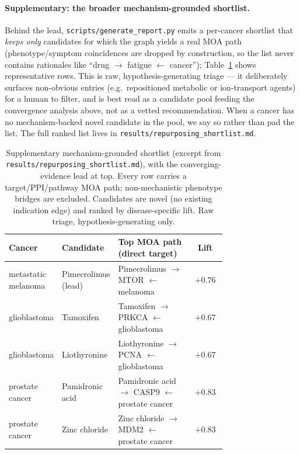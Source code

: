 \documentclass[11pt]{article}
\begin{document}
\begin{sloppypar}
\paragraph{Supplementary: the broader mechanism-grounded shortlist.} Behind the lead,
\texttt{scripts/generate\_report.py} emits a per-cancer shortlist that \emph{keeps only}
candidates for which the graph yields a real MOA path (phenotype/symptom coincidences are
dropped by construction, so the list never contains rationales like
``drug $\to$ fatigue $\leftarrow$ cancer''); Table~\ref{tab:dossier} shows representative rows.
This is raw, hypothesis-generating triage --- it deliberately surfaces non-obvious entries
(e.g.\ repositioned metabolic or ion-transport agents) for a human to filter, and is best read
as a candidate pool feeding the convergence analysis above, not as a vetted recommendation.
When a cancer has no mechanism-backed novel candidate in the pool, we say so rather than pad
the list. The full ranked list lives in \texttt{results/repurposing\_shortlist.md}.
\end{sloppypar}

\begin{table}[H]
\centering\small
\begin{tabular}{>{\raggedright\arraybackslash}p{0.20\linewidth} >{\raggedright\arraybackslash}p{0.20\linewidth} >{\raggedright\arraybackslash}p{0.34\linewidth} c}
\toprule
\rowcolor{sriblue}\color{white}\textbf{Cancer} & \color{white}\textbf{Candidate} & \color{white}\textbf{Top MOA path (direct target)} & \color{white}\textbf{Lift}\\
\midrule
\rowcolor{srirow} metastatic melanoma & Pimecrolimus (lead) & Pimecrolimus $\to$ MTOR $\leftarrow$ melanoma & $+0.76$\\
glioblastoma & Tamoxifen & Tamoxifen $\to$ PRKCA $\leftarrow$ glioblastoma & $+0.67$\\
\rowcolor{srirow} glioblastoma & Liothyronine & Liothyronine $\to$ PCNA $\leftarrow$ glioblastoma & $+0.67$\\
prostate cancer & Pamidronic acid & Pamidronic acid $\to$ CASP9 $\leftarrow$ prostate cancer & $+0.83$\\
\rowcolor{srirow} prostate cancer & Zinc chloride & Zinc chloride $\to$ MDM2 $\leftarrow$ prostate cancer & $+0.83$\\
\bottomrule
\end{tabular}
\caption{Supplementary mechanism-grounded shortlist (excerpt from
\texttt{results/repurposing\_shortlist.md}), with the converging-evidence lead at top. Every
row carries a target/PPI/pathway MOA path; non-mechanistic phenotype bridges are excluded.
Candidates are novel (no existing indication edge) and ranked by disease-specific lift. Raw
triage, hypothesis-generating only.}
\label{tab:dossier}
\end{table}
\end{document}
